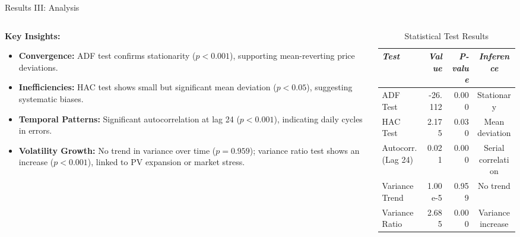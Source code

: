 \documentclass[aspectratio=169,xcolor=dvipsnames]{beamer}
\begin{document}
\begin{frame}{Results III: Analysis}
\begin{columns}
    \begin{column}{0.4\textwidth}
    \footnotesize
        \textbf{Key Insights:}
        \begin{itemize}
            \item \textbf{Convergence:} ADF test confirms stationarity ($p < 0.001$), supporting mean-reverting price deviations.
            \item \textbf{Inefficiencies:} HAC test shows small but significant mean deviation ($p < 0.05$), suggesting systematic biases.
            \item \textbf{Temporal Patterns:} Significant autocorrelation at lag 24 ($p < 0.001$), indicating daily cycles in errors.
            \item \textbf{Volatility Growth:} No trend in variance over time ($p = 0.959$); variance ratio test shows an increase ($p < 0.001$), linked to PV expansion or market stress.
        \end{itemize}
    \end{column}

    \begin{column}{0.6\textwidth}
        \centering
        \scriptsize
        \begin{table}[ht]
           \caption{Statistical Test Results}
           \label{tab:test_results}
           \begin{tabular}{lrrc}
               \hline
               \textit{Test} & \textit{Value} & \textit{P-value} & \textit{Inference} \\
               \hline
               ADF Test & -26.112 & 0.000 & Stationary \\
               HAC Test & 2.175 & 0.030 & Mean deviation \\
               Autocorr. (Lag 24) & 0.021 & 0.000 & Serial correlation \\
               Variance Trend & 1.00e-5 & 0.959 & No trend \\
               Variance Ratio & 2.685 & 0.000 & Variance increase \\
               \hline
           \end{tabular}
        \end{table}
    \end{column}
\end{columns}
\end{frame}
\end{document}
